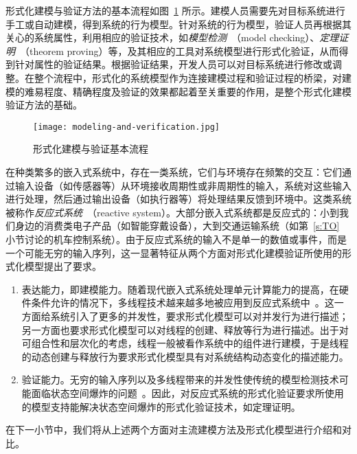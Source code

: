 形式化建模与验证方法的基本流程如图~\ref{f:modeling-and-verification} 所示。建模人员需要先对目标系统进行手工或自动建模，得到系统的行为模型。针对系统的行为模型，验证人员再根据其关心的系统属性，利用相应的验证技术，如\emph{模型检测}~\cite{clarke1999model}（model checking）、\emph{定理证明}~\cite{DBLP:books/daglib/0070484}（theorem proving）等，及其相应的工具对系统模型进行形式化验证，从而得到针对属性的验证结果。根据验证结果，开发人员可以对目标系统进行修改或调整。在整个流程中，形式化的系统模型作为连接建模过程和验证过程的桥梁，对建模的难易程度、精确程度及验证的效果都起着至关重要的作用，是整个形式化建模验证方法的基础。

\begin{figure}[ht]
\centering
\texttt{[image: modeling-and-verification.jpg]}
\caption{形式化建模与验证基本流程}
\label{f:modeling-and-verification}
\end{figure}

在种类繁多的嵌入式系统中，存在一类系统，它们与环境存在频繁的交互：它们通过输入设备（如传感器等）从环境接收周期性或非周期性的输入，系统对这些输入进行处理，然后通过输出设备（如执行器等）将处理结果反馈到环境中。这类系统被称作\emph{反应式系统}~\cite{DBLP:conf/iccd/Koopman96,DBLP:books/daglib/0010292}（reactive system）。大部分嵌入式系统都是反应式的：小到我们身边的消费类电子产品（如智能穿戴设备），大到交通运输系统（如第~\ref{s:TO} 小节讨论的机车控制系统）。由于反应式系统的输入不是单一的数值或事件，而是一个可能无穷的输入序列，这一显著特征从两个方面对形式化建模验证所使用的形式化模型提出了要求。
\begin{enumerate}
\item 
表达能力，即建模能力。随着现代嵌入式系统处理单元计算能力的提高，在硬件条件允许的情况下，多线程技术越来越多地被应用到反应式系统中~\cite{DBLP:conf/codes/GerndtE97,DBLP:journals/sigsoft/White11,DBLP:journals/tc/LiH12}。这一方面给系统引入了更多的并发性，要求形式化模型可以对并发行为进行描述；另一方面也要求形式化模型可以对线程的创建、释放等行为进行描述。出于对可组合性和层次化的考虑，线程一般被看作系统中的组件进行建模，于是线程的动态创建与释放行为要求形式化模型具有对系统结构动态变化的描述能力。
\item
验证能力。无穷的输入序列以及多线程带来的并发性使传统的模型检测技术可能面临状态空间爆炸的问题~\cite{DBLP:conf/ac/Valmari96}。因此，对反应式系统的形式化验证要求所使用的模型支持能解决状态空间爆炸的形式化验证技术，如定理证明。
\end{enumerate}

在下一小节中，我们将从上述两个方面对主流建模方法及形式化模型进行介绍和对比。

